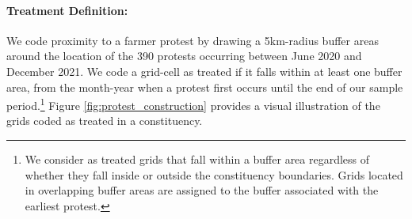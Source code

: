 \documentclass[12pt]{article}
\begin{document}
\paragraph{Treatment Definition:} We code proximity to a farmer protest by drawing a %
5km-radius buffer areas around the location of the 390 protests occurring between June 2020 and December 2021. We code a grid-cell as treated if it falls within at least one buffer area, from the month-year when a protest first occurs until the end of our sample period.\footnote{We consider as treated grids that fall within a buffer area regardless of whether they fall inside or outside the constituency boundaries. Grids located in overlapping buffer areas are assigned to the buffer associated with the earliest protest. } Figure \ref{fig:protest_construction} provides a visual illustration of the grids coded as treated in a constituency. %
\end{document}
